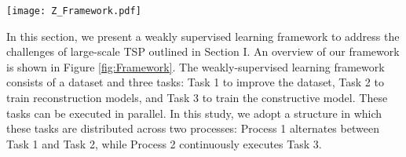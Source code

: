 \begin{figure*}[t]
\centering
\texttt{[image: Z\_Framework.pdf]}
\caption{The overview of the proposed framework. The framework consists of a dataset and three tasks, which can be executed in parallel. In this paper, we adopt a sequential execution approach for Task 1 and Task 2.}
\label{fig:Framework}
\end{figure*}

In this section, we present a weakly supervised learning framework to address the challenges of large-scale TSP outlined in Section I. An overview of our framework is shown in Figure \ref{fig:Framework}. The weakly-supervised learning framework consists of a dataset and three tasks: Task 1 to improve the dataset, Task 2 to train reconstruction models, and Task 3 to train the constructive model. These tasks can be executed in parallel. In this study, we adopt a structure in which these tasks are distributed across two processes: Process 1 alternates between Task 1 and Task 2, while Process 2 continuously executes Task 3. 

